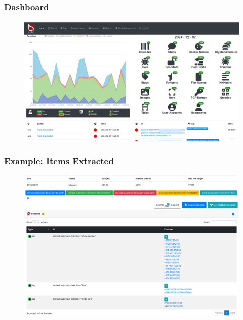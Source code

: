 \documentclass[aspectratio=169]{beamer}
\begin{document}


\begin{frame}
    \frametitle{Dashboard}
    \begin{figure}
        \includegraphics[scale=0.18, angle=0]{screenshot/dashboard.jpeg}
    \end{figure}
\end{frame}

\begin{frame}
    \frametitle{Example: Items Extracted}
    \begin{figure}
        \includegraphics[scale=0.20, angle=0]{screenshot/item_meta.png}
    \end{figure}
\end{frame}
\end{document}
